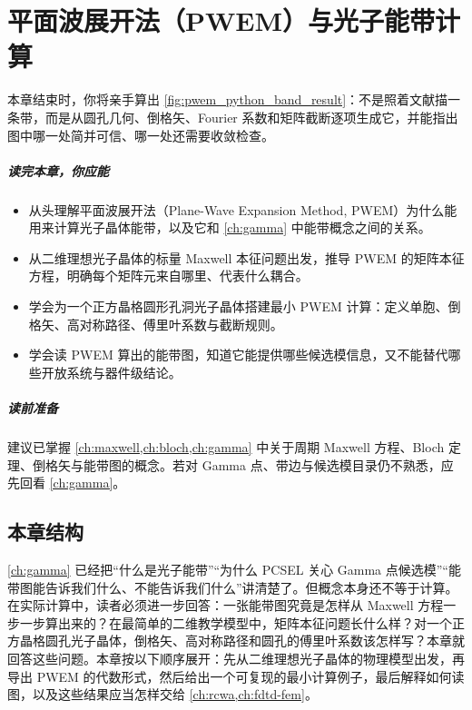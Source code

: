 \chapter{平面波展开法（PWEM）与光子能带计算}
\label{ch:pwe}

本章结束时，你将亲手算出 \cref{fig:pwem_python_band_result}：不是照着文献描一条带，而是从圆孔几何、倒格矢、Fourier 系数和矩阵截断逐项生成它，并能指出图中哪一处简并可信、哪一处还需要收敛检查。

\paragraph{读完本章，你应能}
\begin{itemize}
  \item 从头理解平面波展开法（Plane-Wave Expansion Method, PWEM）为什么能用来计算光子晶体能带，以及它和 \cref{ch:gamma} 中能带概念之间的关系。
  \item 从二维理想光子晶体的标量 Maxwell 本征问题出发，推导 PWEM 的矩阵本征方程，明确每个矩阵元来自哪里、代表什么耦合。
  \item 学会为一个正方晶格圆形孔洞光子晶体搭建最小 PWEM 计算：定义单胞、倒格矢、高对称路径、傅里叶系数与截断规则。
  \item 学会读 PWEM 算出的能带图，知道它能提供哪些候选模信息，又不能替代哪些开放系统与器件级结论。
\end{itemize}

\paragraph{读前准备}
建议已掌握 \cref{ch:maxwell,ch:bloch,ch:gamma} 中关于周期 Maxwell 方程、Bloch 定理、倒格矢与能带图的概念。若对 Gamma 点、带边与候选模目录仍不熟悉，应先回看 \cref{ch:gamma}。

\section*{本章结构}
\cref{ch:gamma} 已经把“什么是光子能带”“为什么 PCSEL 关心 Gamma 点候选模”“能带图能告诉我们什么、不能告诉我们什么”讲清楚了。但概念本身还不等于计算。在实际计算中，读者必须进一步回答：一张能带图究竟是怎样从 Maxwell 方程一步一步算出来的？在最简单的二维教学模型中，矩阵本征问题长什么样？对一个正方晶格圆孔光子晶体，倒格矢、高对称路径和圆孔的傅里叶系数该怎样写？本章就回答这些问题。本章按以下顺序展开：先从二维理想光子晶体的物理模型出发，再导出 PWEM 的代数形式，然后给出一个可复现的最小计算例子，最后解释如何读图，以及这些结果应当怎样交给 \cref{ch:rcwa,ch:fdtd-fem}。

